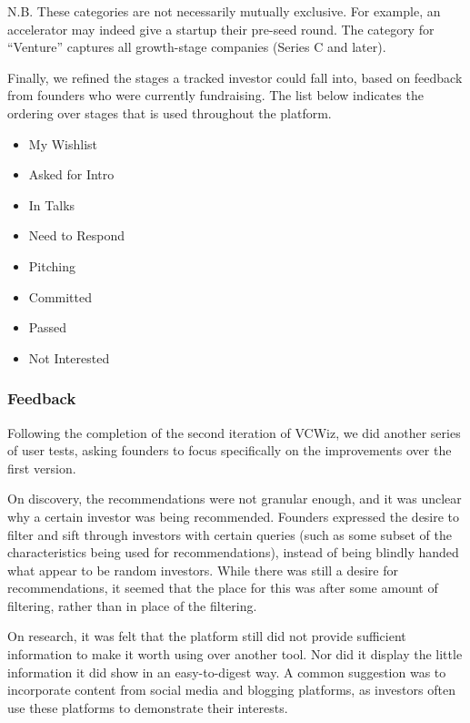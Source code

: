 N.B. These categories are not necessarily mutually exclusive. For example, an accelerator may indeed give a startup their pre-seed round. The category for ``Venture'' captures all growth-stage companies (Series C and later).

Finally, we refined the stages a tracked investor could fall into, based on feedback from founders who were currently fundraising. The list below indicates the ordering over stages that is used throughout the platform.

\begin{multicols}{2}
\begin{itemize}
  \item My Wishlist
  \item Asked for Intro
  \item In Talks
  \item Need to Respond
  \item Pitching
  \item Committed
  \item Passed
  \item Not Interested
\end{itemize}
\end{multicols}

\subsubsection{Feedback}

Following the completion of the second iteration of VCWiz, we did another series of user tests, asking founders to focus specifically on the improvements over the first version.

On discovery, the recommendations were not granular enough, and it was unclear why a certain investor was being recommended. Founders expressed the desire to filter and sift through investors with certain queries (such as some subset of the characteristics being used for recommendations), instead of being blindly handed what appear to be random investors. While there was still a desire for recommendations, it seemed that the place for this was after some amount of filtering, rather than in place of the filtering.

On research, it was felt that the platform still did not provide sufficient information to make it worth using over another tool. Nor did it display the little information it did show in an easy-to-digest way. A common suggestion was to incorporate content from social media and blogging platforms, as investors often use these platforms to demonstrate their interests.

